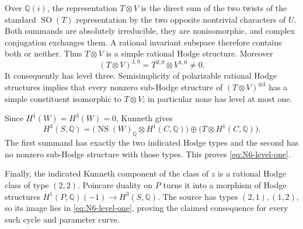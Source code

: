 Over $\mathbb Q(i)$, the representation $T\otimes V$ is the direct sum
of the two twists of the standard $\operatorname{SO}(T)$ representation
by the two opposite nontrivial characters of $U$. Both summands are
absolutely irreducible, they are nonisomorphic, and complex conjugation
exchanges them. A rational invariant subspace therefore contains both
or neither. Thus $T\otimes V$ is a simple rational Hodge structure.
Moreover
\[
                 (T\otimes V)^{3,0}=T^{2,0}\otimes V^{1,0}\ne0.
\]
It consequently has level three. Semisimplicity of polarizable rational
Hodge structures implies that every nonzero sub-Hodge structure of
$(T\otimes V)^{\oplus3}$ has a simple constituent isomorphic to
$T\otimes V$; in particular none has level at most one.

Since $H^1(W)=H^3(W)=0$, Kunneth gives
\[
 H^3(S,\mathbb Q)=
 \bigl(\operatorname{NS}(W)_{\mathbb Q}\otimes H^1(C,\mathbb Q)\bigr)
 \oplus\bigl(T\otimes H^1(C,\mathbb Q)\bigr).
\]
The first summand has exactly the two indicated Hodge types and the
second has no nonzero sub-Hodge structure with those types. This proves
\eqref{eq:N6-level-one}.

Finally, the indicated Kunneth component of the class of $z$ is a
rational Hodge class of type $(2,2)$. Poincare duality on $P$ turns it
into a morphism of Hodge structures
$H^1(P,\mathbb Q)(-1)\to H^3(S,\mathbb Q)$. The source has types
$(2,1),(1,2)$, so its image lies in \eqref{eq:N6-level-one}, proving
the claimed consequence for every such cycle and parameter curve.
